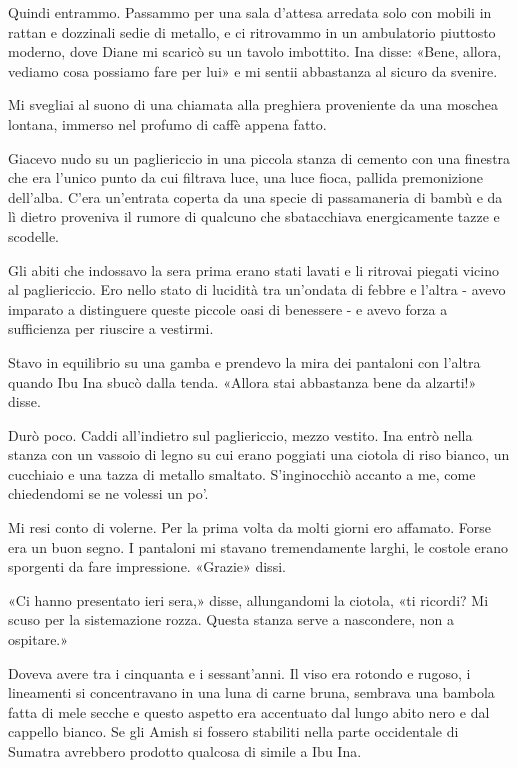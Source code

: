 Quindi entrammo. Passammo per una sala d'attesa arredata solo con mobili
in rattan e dozzinali sedie di metallo, e ci ritrovammo in un
ambulatorio piuttosto moderno, dove Diane mi scaricò su un tavolo
imbottito. Ina disse: «Bene, allora, vediamo cosa possiamo fare per lui»
e mi sentii abbastanza al sicuro da svenire.

\separatorefiori

Mi svegliai al suono di una chiamata alla preghiera proveniente da una
moschea lontana, immerso nel profumo di caffè appena fatto.

Giacevo nudo su un pagliericcio in una piccola stanza di cemento con una
finestra che era l'unico punto da cui filtrava luce, una luce fioca,
pallida premonizione dell'alba. C'era un'entrata coperta da una specie
di passamaneria di bambù e da lì dietro proveniva il rumore di qualcuno
che sbatacchiava energicamente tazze e scodelle.

Gli abiti che indossavo la sera prima erano stati lavati e li ritrovai
piegati vicino al pagliericcio. Ero nello stato di lucidità tra
un'ondata di febbre e l'altra - avevo imparato a distinguere queste
piccole oasi di benessere - e avevo forza a sufficienza per riuscire a
vestirmi.

Stavo in equilibrio su una gamba e prendevo la mira dei pantaloni con
l'altra quando Ibu Ina sbucò dalla tenda. «Allora stai abbastanza bene
da alzarti!» disse.

Durò poco. Caddi all'indietro sul pagliericcio, mezzo vestito. Ina entrò
nella stanza con un vassoio di legno su cui erano poggiati una ciotola
di riso bianco, un cucchiaio e una tazza di metallo smaltato.
S'inginocchiò accanto a me, come chiedendomi se ne volessi un po'.

Mi resi conto di volerne. Per la prima volta da molti giorni ero
affamato. Forse era un buon segno. I pantaloni mi stavano tremendamente
larghi, le costole erano sporgenti da fare impressione. «Grazie» dissi.

«Ci hanno presentato ieri sera,» disse, allungandomi la ciotola, «ti
ricordi? Mi scuso per la sistemazione rozza. Questa stanza serve a
nascondere, non a ospitare.»

Doveva avere tra i cinquanta e i sessant'anni. Il viso era rotondo e
rugoso, i lineamenti si concentravano in una luna di carne bruna,
sembrava una bambola fatta di mele secche e questo aspetto era
accentuato dal lungo abito nero e dal cappello bianco. Se gli Amish si
fossero stabiliti nella parte occidentale di Sumatra avrebbero prodotto
qualcosa di simile a Ibu Ina.

